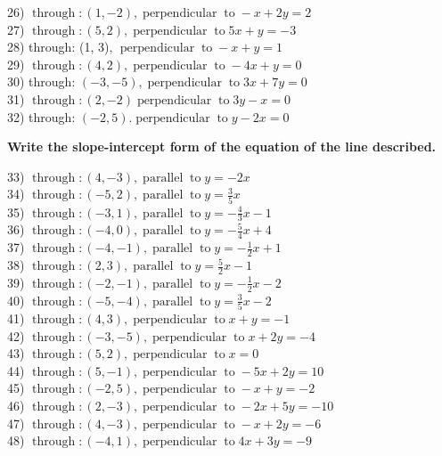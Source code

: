 \documentclass[12pt]{book}
\theoremstyle{definition}
\newcommand{\tmop}[1]{\ensuremath{\operatorname{#1}}}
\begin{document}
26) $\tmop{through} : (1, - 2), \tmop{perpendicular} \tmop{to} - x + 2 y = 2$\\
27) $\tmop{through} : (5, 2), \tmop{perpendicular} \tmop{to} 5 x + y = - 3$\\
28) through: (1, 3), $\tmop{perpendicular} \tmop{to} - x + y = 1$\\
29) $\tmop{through} : (4, 2), \tmop{perpendicular} \tmop{to} - 4 x + y = 0$\\
30) through: $(- 3, - 5), \tmop{perpendicular} \tmop{to} 3 x + 7 y = 0$\\
31) $\tmop{through} : (2, - 2) \tmop{perpendicular} \tmop{to} 3 y - x = 0$\\
32) through: $(- 2, 5) . \tmop{perpendicular} \tmop{to} y - 2 x = 0$\par
{\bf Write the slope-intercept form of the equation of the line described.}\par
33) $\tmop{through} : (4, - 3), \tmop{parallel} \tmop{to} y = - 2 x$\\
34) $\tmop{through} : (- 5, 2), \tmop{parallel} \tmop{to} y = \frac{3}{5} x$\\
35) $\tmop{through} : (- 3, 1), \tmop{parallel} \tmop{to} y = - \frac{4}{3} x- 1$\\
36) $\tmop{through} : (- 4, 0), \tmop{parallel} \tmop{to} y = - \frac{5}{4} x+ 4$\\
37) $\tmop{through} : (- 4, - 1), \tmop{parallel} \tmop{to} y = - \frac{1}{2}x + 1$\\
38) $\tmop{through} : (2, 3), \tmop{parallel} \tmop{to} y = \frac{5}{2} x - 1$\\
39) $\tmop{through} : (- 2, - 1), \tmop{parallel} \tmop{to} y = - \frac{1}{2}x - 2$\\
40) $\tmop{through} : (- 5, - 4), \tmop{parallel} \tmop{to} y = \frac{3}{5} x- 2$\\
41) $\tmop{through} : (4, 3), \tmop{perpendicular} \tmop{to} x + y = - 1$\\
42) $\tmop{through} : (- 3, - 5), \tmop{perpendicular} \tmop{to} x + 2 y = -4$\\
43) $\tmop{through} : (5, 2), \tmop{perpendicular} \tmop{to} x = 0$\\
44) $\tmop{through} : (5, - 1), \tmop{perpendicular} \tmop{to} - 5 x + 2 y =10$\\
45) $\tmop{through} : (- 2, 5), \tmop{perpendicular} \tmop{to} - x + y = - 2$\\
46) $\tmop{through} : (2, - 3), \tmop{perpendicular} \tmop{to} - 2 x + 5 y = -10$\\
47) $\tmop{through} : (4, - 3), \tmop{perpendicular} \tmop{to} - x + 2 y = -6$\\
48) $\tmop{through} : (- 4, 1), \tmop{perpendicular} \tmop{to} 4 x + 3 y = -9$
\end{document}
